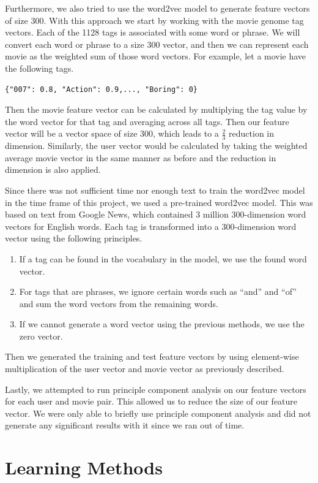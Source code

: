 \documentclass{sig-alternate-05-2015}
\begin{document}
Furthermore, we also tried to use the word2vec model to generate feature vectors of size 300.
With this approach we start by working with the movie genome tag vectors. Each of the 1128 tags is associated with some word or phrase.
We will convert each word or phrase to a size 300 vector, and then we can represent each movie as the weighted sum of those word vectors.
For example, let a movie have the following tags.
\begin{verbatim}
{"007": 0.8, "Action": 0.9,..., "Boring": 0}
\end{verbatim}
Then the movie feature vector can be calculated by multiplying the tag value by the word vector for that tag and averaging across
all tags. Then our feature vector will be a vector space of size 300, which leads to a \(\frac{2}{3}\) reduction in dimension.
Similarly, the user vector would be calculated by taking the weighted average movie vector in the same manner as before
and the reduction in dimension is also applied.

Since there was not sufficient time nor enough text to train the word2vec model in the time frame of this project,
we used a pre-trained word2vec model. This was based on text from Google News, which contained 3 million 300-dimension word vectors
for English words. Each tag is transformed into a 300-dimension word vector using the following principles.
\begin{enumerate}
    \item If a tag can be found in the vocabulary in the model, we use the found word vector.
    \item For tags that are phrases, we ignore certain words such as ``and'' and ``of'' and sum the word vectors from the remaining words.
    \item If we cannot generate a word vector using the previous methods, we use the zero vector.
\end{enumerate}
Then we generated the training and test feature vectors by using element-wise multiplication of the user vector and movie vector as previously
described.

Lastly, we attempted to run principle component analysis on our feature vectors for each user and movie pair. This allowed
us to reduce the size of our feature vector. We were only able to briefly use principle component analysis and did not generate
any significant results with it since we ran out of time.

\section{Learning Methods}
\end{document}
